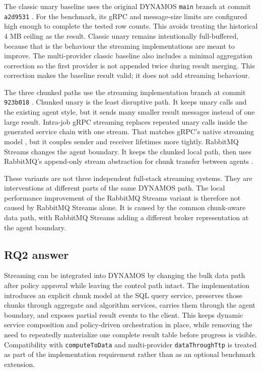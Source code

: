 The classic unary baseline uses the original DYNAMOS \texttt{main} branch at commit \texttt{a2d9531} \cite{dynamosMainCommit2026}. For the benchmark, its gRPC and message-size limits are configured high enough to complete the tested row counts. This avoids treating the historical 4 MB ceiling as the result. Classic unary remains intentionally full-buffered, because that is the behaviour the streaming implementations are meant to improve. The multi-provider classic baseline also includes a minimal aggregation correction so the first provider is not appended twice during result merging. This correction makes the baseline result valid; it does not add streaming behaviour.

The three chunked paths use the streaming implementation branch at commit \texttt{923b018} \cite{dynamosStreamingCommit2026}. Chunked unary is the least disruptive path. It keeps unary calls and the existing agent style, but it sends many smaller result messages instead of one large result. Intra-job gRPC streaming replaces repeated unary calls inside the generated service chain with one stream. That matches gRPC's native streaming model \cite{grpc2024coreconcepts}, but it couples sender and receiver lifetimes more tightly. RabbitMQ Streams changes the agent boundary. It keeps the chunked local path, then uses RabbitMQ's append-only stream abstraction for chunk transfer between agents \cite{rabbitmq2026streams}.

These variants are not three independent full-stack streaming systems. They are interventions at different parts of the same DYNAMOS path. The local performance improvement of the RabbitMQ Streams variant is therefore not caused by RabbitMQ Streams alone. It is caused by the common chunk-aware data path, with RabbitMQ Streams adding a different broker representation at the agent boundary.

\subsection{RQ2 answer}

Streaming can be integrated into DYNAMOS by changing the bulk data path after policy approval while leaving the control path intact. The implementation introduces an explicit chunk model at the SQL query service, preserves those chunks through aggregate and algorithm services, carries them through the agent boundary, and exposes partial result events to the client. This keeps dynamic service composition and policy-driven orchestration in place, while removing the need to repeatedly materialize one complete result table before progress is visible. Compatibility with \texttt{computeToData} and multi-provider \texttt{dataThroughTtp} is treated as part of the implementation requirement rather than as an optional benchmark extension.

